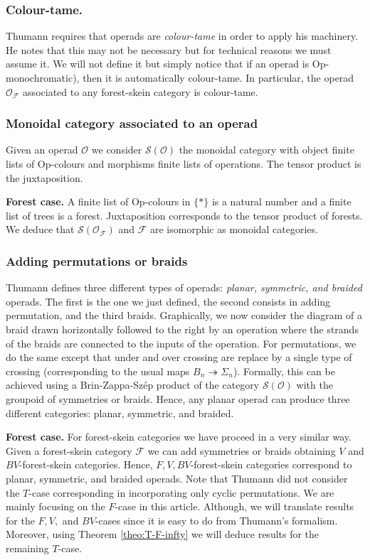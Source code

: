 \documentclass[a4paper, 12pt]{amsart}
\numberwithin{equation}{section}
\theoremstyle{definition}
\newcommand{\cF}{\mathcal F}
\newcommand{\cO}{\mathcal O}
\newcommand{\onto}{\twoheadrightarrow}
\newcommand{\cS}{\mathcal{S}}
\begin{document}
\subsubsection{Colour-tame.}
Thumann requires that operads are {\it colour-tame} in order to apply his machinery. 
He notes that this may not be necessary but for technical reasons we must assume it.
We will not define it but simply notice that if an operad is Op-monochromatic), then it is automatically colour-tame.
In particular, the operad $\cO_\cF$ associated to any forest-skein category is colour-tame.

\subsubsection{Monoidal category associated to an operad}
Given an operad $\cO$ we consider $\cS(\cO)$ the monoidal category with object finite lists of Op-colours and morphisms finite lists of operations. The tensor product is the juxtaposition.

{\bf Forest case.}
A finite list of Op-colours in $\{*\}$ is a natural number and a finite list of trees is a forest. Juxtaposition corresponds to the tensor product of forests.
We deduce that $\cS(\cO_\cF)$ and $\cF$ are isomorphic as monoidal categories. 

\subsubsection{Adding permutations or braids}
Thumann defines three different types of operads: {\it planar, symmetric, and braided} operads.
The first is the one we just defined, the second consists in adding permutation, and the third braids.
Graphically, we now consider the diagram of a braid drawn horizontally followed to the right by an operation where the strands of the braids are connected to the inputs of the operation. 
For permutations, we do the same except that under and over crossing are replace by a single type of crossing (corresponding to the usual maps $B_n\onto \Sigma_n$).
Formally, this can be achieved using a Brin-Zappa-Sz\'ep product of the category $\cS(\cO)$ with the groupoid of symmetries or braids. 
Hence, any planar operad can produce three different categories: planar, symmetric, and braided.

{\bf Forest case.} 
For forest-skein categories we have proceed in a very similar way. Given a forest-skein category $\cF$ we can add symmetries or braids obtaining $V$ and $BV$-forest-skein categories.
Hence, $F,V,BV$-forest-skein categories correspond to planar, symmetric, and braided operads. 
Note that Thumann did not consider the $T$-case corresponding in incorporating only cyclic permutations.
We are mainly focusing on the $F$-case in this article. Although, we will translate results for the $F,V,$ and $BV$-cases since it is easy to do from Thumann's formalism. 
Moreover, using Theorem \ref{theo:T-F-infty} we will deduce results for the remaining $T$-case.
\end{document}
